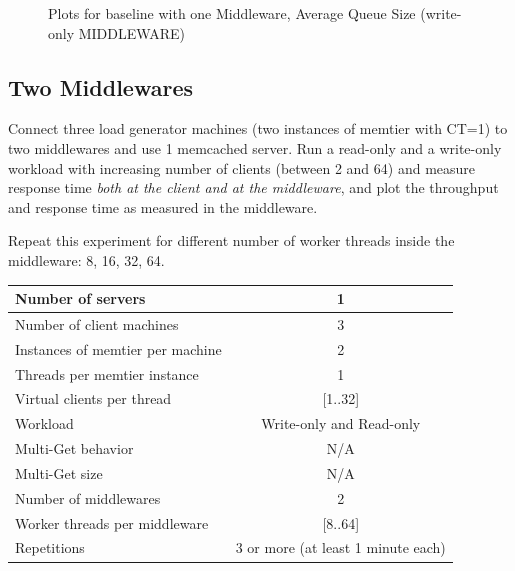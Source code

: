 \documentclass[11pt,a4paper]{article}
\begin{document}
\begin{figure}[!h]
  \centering
    \caption{Plots for baseline with one Middleware, Average Queue Size (write-only MIDDLEWARE)}
  \label{fig:baseline_mw_1_mw_mw_qs_wo}
\end{figure}

\subsection{Two Middlewares}

Connect three load generator machines (two instances of memtier with CT=1) to two middlewares and use 1 memcached server. Run a read-only and a write-only workload with increasing number of clients (between 2 and 64) and measure response time \emph{both at the client and at the middleware}, and plot the throughput and response time as measured in the middleware.

Repeat this experiment for different number of worker threads inside the middleware: 8, 16, 32, 64.

\begin{center}
	\scriptsize{
		\begin{tabular}{|l|c|}
			\hline Number of servers                & 1                        \\ 
			\hline Number of client machines        & 3                        \\ 
			\hline Instances of memtier per machine & 2                        \\ 
			\hline Threads per memtier instance     & 1                        \\
			\hline Virtual clients per thread       & [1..32]                  \\ 
			\hline Workload                         & Write-only and Read-only \\
			\hline Multi-Get behavior               & N/A                      \\
			\hline Multi-Get size                   & N/A                      \\
			\hline Number of middlewares            & 2                        \\
			\hline Worker threads per middleware    & [8..64]                  \\
			\hline Repetitions                      & 3 or more (at least 1 minute each)                \\ 
			\hline 
		\end{tabular}
	} 
\end{center}
\end{document}
